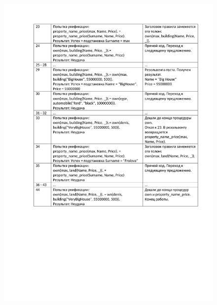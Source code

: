 \begin{figure}[H]
	\begin{center}
		\includegraphics[scale=0.85]{img/13.2.pdf}
	\end{center}
	
\end{figure}
